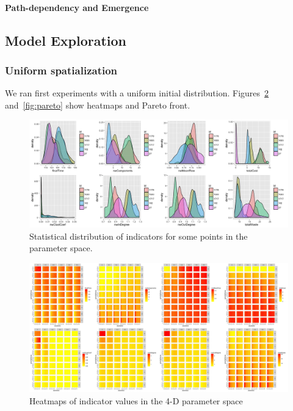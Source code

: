 \documentclass[fleqn,10pt]{wlscirep}
\begin{document}
{\paragraph*{Path-dependency and Emergence}





\subsection*{Model Exploration}


\subsubsection*{Uniform spatialization}

We ran first experiments with a uniform initial distribution. Figures~\ref{fig:heatmap} and~\ref{fig:pareto} show heatmaps and Pareto front.


\begin{figure}
\hspace{-2cm}\includegraphics[width=1.3\textwidth]{figures/indics_distrib.png}
\caption{Statistical distribution of indicators for some points in the parameter space.}
\label{fig:stat-distrib}
\end{figure}

\begin{figure}
\hspace{-2cm}\includegraphics[width=1.3\textwidth]{figures/heatmap_indics}
\caption{Heatmaps of indicator values in the 4-D parameter space}
\label{fig:heatmap}
\end{figure}

}
\end{document}
